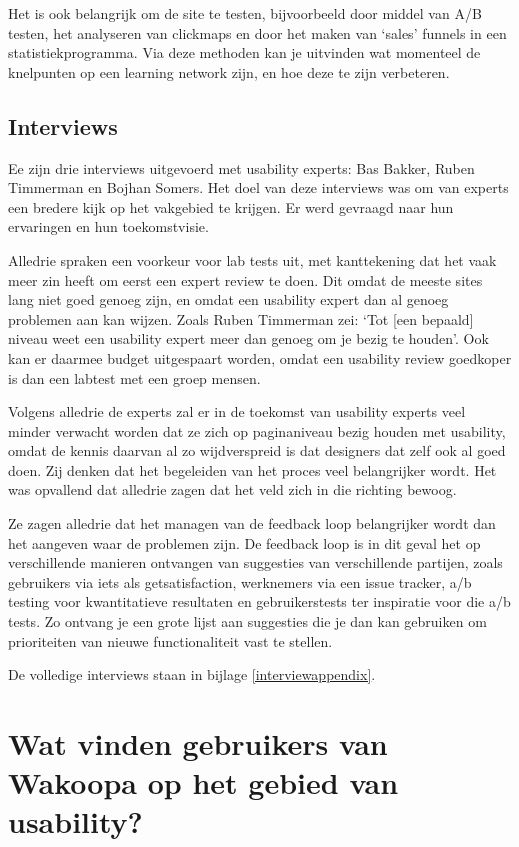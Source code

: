 \documentclass[a4paper, 10pt, pdftex]{report}
\begin{document}
    Het is ook belangrijk om de site te testen, bijvoorbeeld door middel van A/B testen, het analyseren van clickmaps en door het maken van `sales' funnels in een statistiekprogramma. Via deze methoden kan je uitvinden wat momenteel de knelpunten op een learning network zijn, en hoe deze te zijn verbeteren.

  \section{Interviews}
    Ee zijn drie interviews uitgevoerd met usability experts: Bas Bakker, Ruben Timmerman en Bojhan Somers. Het doel van deze interviews was om van experts een bredere kijk op het vakgebied te krijgen. Er werd gevraagd naar hun ervaringen en hun toekomstvisie.

    Alledrie spraken een voorkeur voor lab tests uit, met kanttekening dat het vaak meer zin heeft om eerst een expert review te doen. Dit omdat de meeste sites lang niet goed genoeg zijn, en omdat een usability expert dan al genoeg problemen aan kan wijzen. Zoals Ruben Timmerman zei: `Tot [een bepaald] niveau weet een usability expert meer dan genoeg om je bezig te houden'. Ook kan er daarmee budget uitgespaart worden, omdat een usability review goedkoper is dan een labtest met een groep mensen.

    Volgens alledrie de experts zal er in de toekomst van usability experts veel minder verwacht worden dat ze zich op paginaniveau bezig houden met usability, omdat de kennis daarvan al zo wijdverspreid is dat designers dat zelf ook al goed doen. Zij denken dat het begeleiden van het proces veel belangrijker wordt. Het was opvallend dat alledrie zagen dat het veld zich in die richting bewoog.

    Ze zagen alledrie dat het managen van de feedback loop belangrijker wordt dan het aangeven waar de problemen zijn. De feedback loop is in dit geval het op verschillende manieren ontvangen van suggesties van verschillende partijen, zoals gebruikers via iets als getsatisfaction, werknemers via een issue tracker, a/b testing voor kwantitatieve resultaten en gebruikerstests ter inspiratie voor die a/b tests. Zo ontvang je een grote lijst aan suggesties die je dan kan gebruiken om prioriteiten van nieuwe functionaliteit vast te stellen.

    De volledige interviews staan in bijlage \ref{interviewappendix}.

  \newpage
  \chapter{Wat vinden gebruikers van Wakoopa op het gebied van usability?}
    \label{userchapter}
    \newpage
\end{document}
